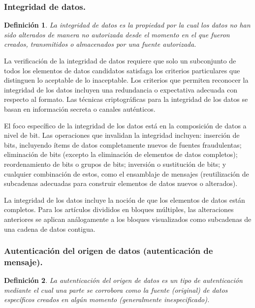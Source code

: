\documentclass[a4paper, 12pt]{article} %
\newtheorem*{mydef1}{Definición} %
\begin{document}
\subsubsection{Integridad de datos.}

\begin{mydef1}
La integridad de datos es la propiedad por la cual los datos no han sido alterados de manera no autorizada desde
el momento en el que fueron creados, transmitidos o almacenados por una fuente autorizada.
\end{mydef1}

La verificación de la integridad de datos requiere que solo un subconjunto de todos los elementos de datos
candidatos satisfaga los criterios particulares que distinguen lo aceptable de lo inaceptable. Los criterios
que permiten reconocer la integridad de los datos incluyen una redundancia o expectativa adecuada con
respecto al formato. Las técnicas criptográficas para la integridad de los datos se basan en información
secreta o canales auténticos.

El foco específico de la integridad de los datos está en la composición de datos a nivel de bit. Las operaciones
que invalidan la integridad incluyen: inserción de bits, incluyendo ítems de datos completamente nuevos de
fuentes fraudulentas; eliminación de bits (excepto la eliminación de elementos de datos completos); reordenamiento
de bits o grupos de bits; inversión o sustitución de bits; y cualquier combinación de estos, como el ensamblaje
de mensajes (reutilización de subcadenas adecuadas para construir elementos de datos nuevos o alterados).

La integridad de los datos incluye la noción de que los elementos de datos están completos. Para los artículos
divididos en bloques múltiples, las alteraciones anteriores se aplican análogamente a los bloques visualizados
como subcadenas de una cadena de datos contigua.

\subsubsection{Autenticación del origen de datos (autenticación de mensaje).}

\begin{mydef1}
La \textit{autenticación del origen de datos} es un tipo de autenticación mediante el cual una parte se corrobora
como la fuente (original) de datos específicos creados en algún momento (generalmente inespecificado).
\end{mydef1}
\end{document}
